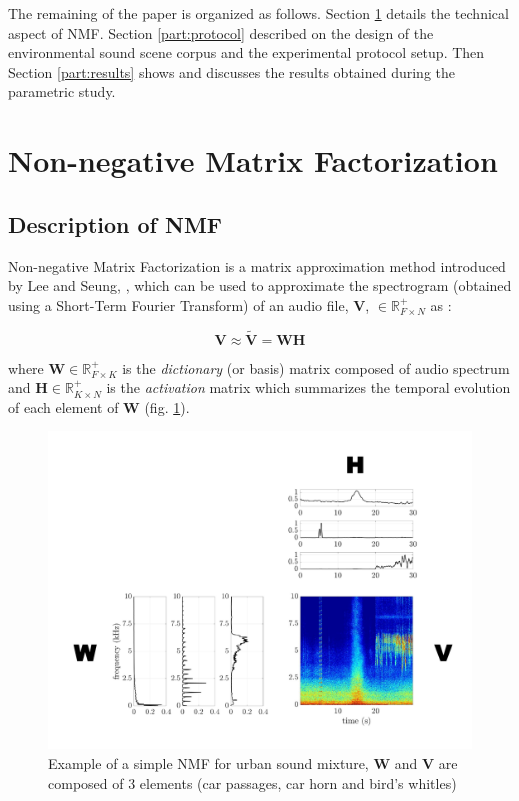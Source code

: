 \documentclass[twocolumn,a4paper,10pt]{article}
\begin{document}
The remaining of the paper is organized as follows. Section \ref{part:nmf} details the technical aspect of NMF. Section \ref{part:protocol} described on the design of the environmental sound scene corpus and the experimental protocol setup. Then Section \ref{part:results} shows and discusses the results obtained during the parametric study.

\section{Non-negative Matrix Factorization}\label{part:nmf}
\subsection{Description of NMF}
Non-negative Matrix Factorization is a matrix approximation method introduced by Lee and Seung, \cite{lee_learning_1999}, which can be used to approximate the spectrogram (obtained using a Short-Term Fourier Transform) of an audio file, $\mathbf{V}$, $\in \mathbb{R}^+_{F \times N}$ as :

\begin{equation}\label{eq:nmf}
\mathbf{V} \approx \mathbf{\tilde{V}} = \mathbf{WH}
\end{equation}

where $\mathbf{W} \in \mathbb{R}^+_{F \times K}$ is the \textit{dictionary} (or basis) matrix composed of audio spectrum and $\mathbf{H} \in \mathbb{R}^+_{K \times N}$ is the \textit{activation} matrix which summarizes the temporal evolution of each element of $\mathbf{W}$ (fig.  \ref{fig:example_NMF}).

\begin{figure}[t]
\centering
\includegraphics[width=0.9\linewidth]{../image/schema_introduction_nmf.pdf}
\caption{Example of a simple NMF  for urban sound mixture, $\mathbf{W}$ and $\mathbf{V}$ are composed of 3 elements (car passages, car horn and bird's whitles)}
\label{fig:example_NMF}
\end{figure}
\end{document}
